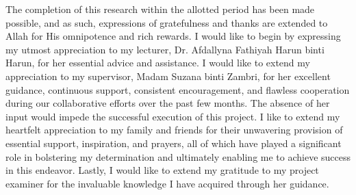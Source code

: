 \begin{acknowledgement}
The completion of this research within the allotted period has been made possible, and as such, expressions of gratefulness and thanks are extended to Allah for His omnipotence and rich rewards. I would like to begin by expressing my utmost appreciation to my lecturer, Dr. Afdallyna Fathiyah Harun binti Harun, for her essential advice and assistance. I would like to extend my appreciation to my supervisor, Madam Suzana binti Zambri, for her excellent guidance, continuous support, consistent encouragement, and flawless cooperation during our collaborative efforts over the past few months. The absence of her input would impede the successful execution of this project. I like to extend my heartfelt appreciation to my family and friends for their unwavering provision of essential support, inspiration, and prayers, all of which have played a significant role in bolstering my determination and ultimately enabling me to achieve success in this endeavor. Lastly, I would like to extend my gratitude to my project examiner for the invaluable knowledge I have acquired through her guidance.
\end{acknowledgement}